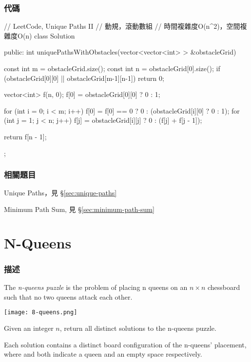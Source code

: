 \subsubsection{代碼}
\begin{Code}
// LeetCode, Unique Paths II
// 動規，滾動數組
// 時間複雜度O(n^2)，空間複雜度O(n)
class Solution {
public:
    int uniquePathsWithObstacles(vector<vector<int> > &obstacleGrid) {
        const int m = obstacleGrid.size();
        const int n = obstacleGrid[0].size();
        if (obstacleGrid[0][0] || obstacleGrid[m-1][n-1]) return 0;

        vector<int> f(n, 0);
        f[0] = obstacleGrid[0][0] ? 0 : 1;

        for (int i = 0; i < m; i++) {
            f[0] = f[0] == 0 ? 0 : (obstacleGrid[i][0] ? 0 : 1);
            for (int j = 1; j < n; j++)
                f[j] = obstacleGrid[i][j] ? 0 : (f[j] + f[j - 1]);
        }

        return f[n - 1];
    }
};
\end{Code}


\subsubsection{相關題目}
\begindot
\item Unique Paths，見 \S \ref{sec:unique-paths}
\item Minimum Path Sum, 見 \S \ref{sec:minimum-path-sum}
\myenddot


\section{N-Queens} %
\label{sec:n-queens}


\subsubsection{描述}
The \emph{n-queens puzzle} is the problem of placing n queens on an $n \times n$ chessboard such that no two queens attack each other.

\begin{center}
\texttt{[image: 8-queens.png]}\\
\label{fig:8-queens}
\end{center}

Given an integer $n$, return all distinct solutions to the n-queens puzzle.

Each solution contains a distinct board configuration of the n-queens' placement, where  and  both indicate a queen and an empty space respectively.

